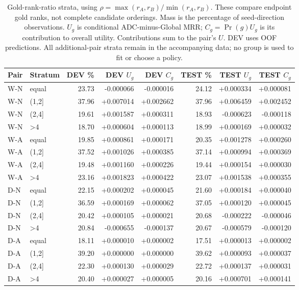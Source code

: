 \begin{table}[htbp]
\centering\footnotesize\setlength{\tabcolsep}{3pt}
\caption{Gold-rank-ratio strata, using $\rho=\max(r_A,r_B)/\min(r_A,r_B)$. These compare endpoint gold ranks, not complete candidate orderings. Mass is the percentage of seed-direction observations. $U_g$ is conditional ADC-minus-Global MRR; $C_g=\Pr(g)U_g$ is its contribution to overall utility. Contributions sum to the pair's $U$. DEV uses OOF predictions. All additional-pair strata remain in the accompanying data; no group is used to fit or choose a policy.}
\label{tab:complement-rank_bins}
\begin{tabular}{llrrrrrr}
\toprule
Pair & Stratum & DEV \% & DEV $U_g$ & DEV $C_g$ & TEST \% & TEST $U_g$ & TEST $C_g$\\
\midrule
W-N & equal & 23.73 & -0.000066 & -0.000016 & 24.12 & +0.000334 & +0.000081\\[2pt]
W-N & (1,2] & 37.96 & +0.007014 & +0.002662 & 37.96 & +0.006459 & +0.002452\\[2pt]
W-N & (2,4] & 19.61 & +0.001587 & +0.000311 & 18.93 & -0.000623 & -0.000118\\[2pt]
W-N & >4 & 18.70 & +0.000604 & +0.000113 & 18.99 & +0.000169 & +0.000032\\[2pt]
\midrule
W-A & equal & 19.85 & +0.000861 & +0.000171 & 20.35 & +0.001278 & +0.000260\\[2pt]
W-A & (1,2] & 37.52 & +0.001026 & +0.000385 & 37.14 & +0.000994 & +0.000369\\[2pt]
W-A & (2,4] & 19.48 & +0.001160 & +0.000226 & 19.44 & +0.000154 & +0.000030\\[2pt]
W-A & >4 & 23.16 & +0.001823 & +0.000422 & 23.07 & +0.001538 & +0.000355\\[2pt]
\midrule
D-N & equal & 22.15 & +0.000202 & +0.000045 & 21.60 & +0.000184 & +0.000040\\[2pt]
D-N & (1,2] & 36.59 & +0.000169 & +0.000062 & 37.05 & +0.000120 & +0.000045\\[2pt]
D-N & (2,4] & 20.42 & +0.000105 & +0.000021 & 20.68 & -0.000222 & -0.000046\\[2pt]
D-N & >4 & 20.84 & -0.000655 & -0.000137 & 20.67 & -0.000579 & -0.000120\\[2pt]
\midrule
D-A & equal & 18.11 & +0.000010 & +0.000002 & 17.51 & +0.000013 & +0.000002\\[2pt]
D-A & (1,2] & 39.20 & +0.000000 & +0.000000 & 39.62 & +0.000093 & +0.000037\\[2pt]
D-A & (2,4] & 22.30 & +0.000130 & +0.000029 & 22.72 & +0.000137 & +0.000031\\[2pt]
D-A & >4 & 20.40 & +0.000027 & +0.000005 & 20.16 & +0.000701 & +0.000141\\[2pt]
\bottomrule
\end{tabular}
\end{table}
